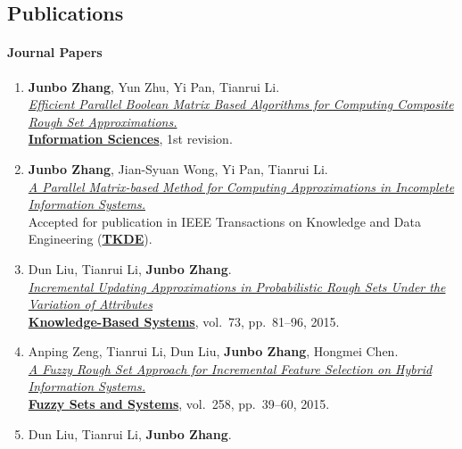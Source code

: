 \documentclass[]{article}
\begin{document}
\subsection{Publications}\label{publications}

\small

\paragraph{Journal Papers}\label{journal-papers}

\begin{enumerate}
\def\labelenumi{\arabic{enumi}.}
\item
  \textbf{Junbo Zhang}, Yun Zhu, Yi Pan, Tianrui Li.\\
  \href{}{\emph{Efficient Parallel Boolean Matrix Based Algorithms for
  Computing Composite Rough Set Approximations.}}\\
  \href{http://www.journals.elsevier.com/information-sciences}{\textbf{Information
  Sciences}}, 1st revision.
\item
  \textbf{Junbo Zhang}, Jian-Syuan Wong, Yi Pan, Tianrui Li.\\
  \href{http://dx.doi.org/10.1109/TKDE.2014.2330821}{\emph{A Parallel
  Matrix-based Method for Computing Approximations in Incomplete
  Information Systems.}}\\ Accepted for publication in IEEE Transactions
  on Knowledge and Data Engineering
  (\href{http://www.computer.org/portal/web/tkde}{\textbf{TKDE}}).
\item
  Dun Liu, Tianrui Li, \textbf{Junbo Zhang}.\\
  \href{http://dx.doi.org/10.1016/j.knosys.2014.09.008}{\emph{Incremental
  Updating Approximations in Probabilistic Rough Sets Under the
  Variation of Attributes}}\\
  \href{http://www.journals.elsevier.com/knowledge-based-systems}{\textbf{Knowledge-Based
  Systems}}, vol.~73, pp.~81--96, 2015.
\item
  Anping Zeng, Tianrui Li, Dun Liu, \textbf{Junbo Zhang}, Hongmei
  Chen.\\ \href{http://dx.doi.org/10.1016/j.fss.2014.08.014}{\emph{A
  Fuzzy Rough Set Approach for Incremental Feature Selection on Hybrid
  Information Systems.}}\\
  \href{http://www.journals.elsevier.com/fuzzy-sets-and-systems}{\textbf{Fuzzy
  Sets and Systems}}, vol.~258, pp.~39--60, 2015.
\item
  Dun Liu, Tianrui Li, \textbf{Junbo Zhang}.\\

\end{enumerate}
\end{document}
